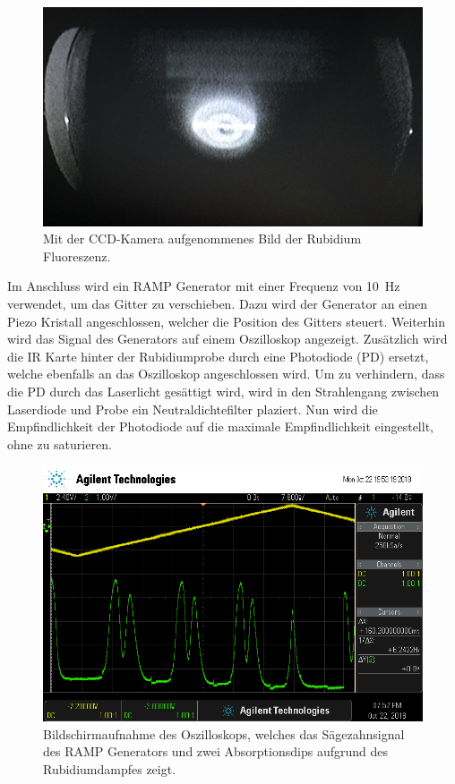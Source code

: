 \begin{figure}
	\centering
	\includegraphics[width=.6\textwidth]{images/florescence.JPG}
	\caption{Mit der CCD-Kamera aufgenommenes Bild der Rubidium Fluoreszenz.}
	\label{fig:RbFlorescence}
\end{figure}

Im Anschluss wird ein RAMP Generator mit einer Frequenz von \SI{10}{\hertz} verwendet,
um das Gitter zu verschieben. Dazu wird der Generator an einen Piezo Kristall
angeschlossen, welcher die Position des Gitters steuert. Weiterhin wird
das Signal des Generators auf einem Oszilloskop angezeigt.
Zusätzlich wird die IR Karte hinter der Rubidiumprobe durch eine Photodiode (PD)
ersetzt, welche ebenfalls an das Oszilloskop angeschlossen wird.
Um zu verhindern, dass die PD durch das Laserlicht gesättigt wird, wird
in den Strahlengang zwischen Laserdiode und Probe ein Neutraldichtefilter plaziert.
Nun wird die Empfindlichkeit der Photodiode auf die maximale Empfindlichkeit
eingestellt, ohne zu saturieren.

\begin{figure}
	\centering
	\includegraphics[width=.8\textwidth]{images/first-signal.png}
	\caption{Bildschirmaufnahme des Oszilloskops, welches das Sägezahnsignal des
	RAMP Generators und zwei Absorptionsdips aufgrund des Rubidiumdampfes zeigt.}
	\label{fig:first-signal}
\end{figure}

